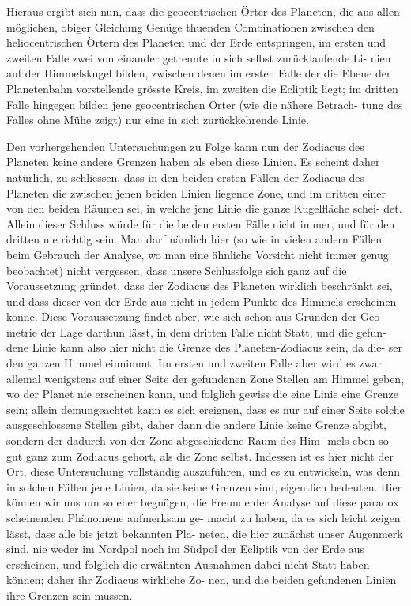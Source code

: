 \documentclass[12pt,a4paper]{article}
\begin{document}
Hieraus ergibt sich nun, dass die geocentrischen Örter des Planeten, die
aus allen möglichen, obiger Gleichung Genüge thuenden Combinationen zwischen
den heliocentrischen Örtern des Planeten und der Erde entspringen, im ersten
und zweiten Falle zwei von einander getrennte in sich selbst zurücklaufende Li-
nien auf der Himmelskugel bilden, zwischen denen im ersten Falle der die Ebene
der Planetenbahn vorstellende grösste Kreis, im zweiten die Ecliptik liegt; im
dritten Falle hingegen bilden jene geocentrischen Örter (wie die nähere Betrach-
tung des Falles ohne Mühe zeigt) nur eine in sich zurückkehrende Linie.

Den vorhergehenden Untersuchungen zu Folge kann nun der Zodiacus des
Planeten keine andere Grenzen haben als eben diese Linien. Es scheint daher
natürlich, zu schliessen, dass in den beiden ersten Fällen der Zodiacus des
Planeten die zwischen jenen beiden Linien liegende Zone, und im dritten einer
von den beiden Räumen sei, in welche jene Linie die ganze Kugelfläche schei-
det. Allein dieser Schluss würde für die beiden ersten Fälle nicht immer, und
für den dritten nie richtig sein. Man darf nämlich hier (so wie in vielen andern
Fällen beim Gebrauch der Analyse, wo man eine ähnliche Vorsicht nicht immer
genug beobachtet) nicht vergessen, dass unsere Schlussfolge sich ganz auf die
Voraussetzung gründet, dass der Zodiacus des Planeten wirklich beschränkt sei,
und dass dieser von der Erde aus nicht in jedem Punkte des Himmels erscheinen
könne. Diese Voraussetzung findet aber, wie sich schon aus Gründen der Geo-
metrie der Lage darthun lässt, in dem dritten Falle nicht Statt, und die gefun-
dene Linie kann also hier nicht die Grenze des Planeten-Zodiacus sein, da die-
ser den ganzen Himmel einnimmt. Im ersten und zweiten Falle aber wird es
zwar allemal wenigstens auf einer Seite der gefundenen Zone Stellen am Himmel
geben, wo der Planet nie erscheinen kann, und folglich gewiss die eine Linie
eine Grenze sein; allein demungeachtet kann es sich ereignen, dass es nur auf
einer Seite solche ausgeschlossene Stellen gibt, daher dann die andere Linie keine
Grenze abgibt, sondern der dadurch von der Zone abgeschiedene Raum des Him-
mels eben so gut ganz zum Zodiacus gehört, als die Zone selbst. Indessen
ist es hier nicht der Ort, diese Untersuchung vollständig auszuführen, und es
zu entwickeln, was denn in solchen Fällen jene Linien, da sie keine Grenzen
sind, eigentlich bedeuten. Hier können wir uns um so eher begnügen, die
Freunde der Analyse auf diese paradox scheinenden Phänomene aufmerksam ge-
macht zu haben, da es sich leicht zeigen lässt, dass alle bis jetzt bekannten Pla-
neten, die hier zunächst unser Augenmerk sind, nie weder im Nordpol noch im
Südpol der Ecliptik von der Erde aus erscheinen, und folglich die erwähnten
Ausnahmen dabei nicht Statt haben können; daher ihr Zodiacus wirkliche Zo-
nen, und die beiden gefundenen Linien ihre Grenzen sein müssen.
\end{document}
